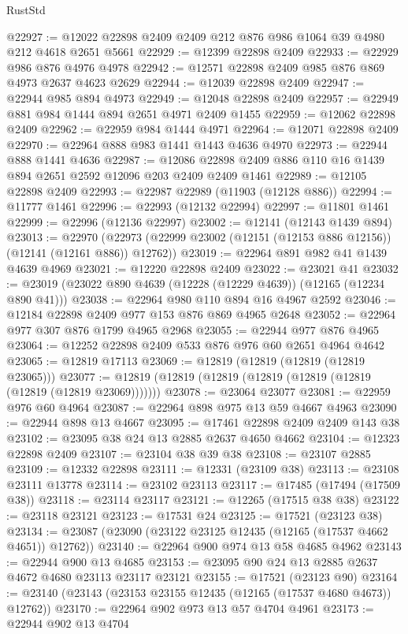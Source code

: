 \begin{lexlean}{RustStd}
\begin{coremodule}
@22927 := @12022 @22898 @2409 @2409 @212 @876 @986 @1064 @39 @4980 @212 @4618 @2651 @5661
@22929 := @12399 @22898 @2409
@22933 := @22929 @986 @876 @4976 @4978
@22942 := @12571 @22898 @2409 @985 @876 @869 @4973 @2637 @4623 @2629
@22944 := @12039 @22898 @2409
@22947 := @22944 @985 @894 @4973
@22949 := @12048 @22898 @2409
@22957 := @22949 @881 @984 @1444 @894 @2651 @4971 @2409 @1455
@22959 := @12062 @22898 @2409
@22962 := @22959 @984 @1444 @4971
@22964 := @12071 @22898 @2409
@22970 := @22964 @888 @983 @1441 @1443 @4636 @4970
@22973 := @22944 @888 @1441 @4636
@22987 := @12086 @22898 @2409 @886 @110 @16 @1439 @894 @2651 @2592 @12096 @203 @2409 @2409 @1461
@22989 := @12105 @22898 @2409
@22993 := @22987 @22989 (@11903 (@12128 @886))
@22994 := @11777 @1461
@22996 := @22993 (@12132 @22994)
@22997 := @11801 @1461
@22999 := @22996 (@12136 @22997)
@23002 := @12141 (@12143 @1439 @894)
@23013 := @22970
    (@22973 (@22999 @23002 (@12151 (@12153 @886 @12156)) (@12141 (@12161 @886)) @12762))
@23019 := @22964 @891 @982 @41 @1439 @4639 @4969
@23021 := @12220 @22898 @2409
@23022 := @23021 @41
@23032 := @23019 (@23022 @890 @4639 (@12228 (@12229 @4639)) (@12165 (@12234 @890 @41)))
@23038 := @22964 @980 @110 @894 @16 @4967 @2592
@23046 := @12184 @22898 @2409 @977 @153 @876 @869 @4965 @2648
@23052 := @22964 @977 @307 @876 @1799 @4965 @2968
@23055 := @22944 @977 @876 @4965
@23064 := @12252 @22898 @2409 @533 @876 @976 @60 @2651 @4964 @4642
@23065 := @12819 @17113
@23069 := @12819 (@12819 (@12819 (@12819 @23065)))
@23077 := @12819 (@12819 (@12819 (@12819 (@12819 (@12819 (@12819 (@12819 @23069)))))))
@23078 := @23064 @23077
@23081 := @22959 @976 @60 @4964
@23087 := @22964 @898 @975 @13 @59 @4667 @4963
@23090 := @22944 @898 @13 @4667
@23095 := @17461 @22898 @2409 @2409 @143 @38
@23102 := @23095 @38 @24 @13 @2885 @2637 @4650 @4662
@23104 := @12323 @22898 @2409
@23107 := @23104 @38 @39 @38
@23108 := @23107 @2885
@23109 := @12332 @22898
@23111 := @12331 (@23109 @38)
@23113 := @23108 @23111 @13778
@23114 := @23102 @23113
@23117 := @17485 (@17494 (@17509 @38))
@23118 := @23114 @23117
@23121 := @12265 (@17515 @38 @38)
@23122 := @23118 @23121
@23123 := @17531 @24
@23125 := @17521 (@23123 @38)
@23134 := @23087 (@23090 (@23122 @23125 @12435 (@12165 (@17537 @4662 @4651)) @12762))
@23140 := @22964 @900 @974 @13 @58 @4685 @4962
@23143 := @22944 @900 @13 @4685
@23153 := @23095 @90 @24 @13 @2885 @2637 @4672 @4680 @23113 @23117 @23121
@23155 := @17521 (@23123 @90)
@23164 := @23140 (@23143 (@23153 @23155 @12435 (@12165 (@17537 @4680 @4673)) @12762))
@23170 := @22964 @902 @973 @13 @57 @4704 @4961
@23173 := @22944 @902 @13 @4704

\end{coremodule}
\end{lexlean}
